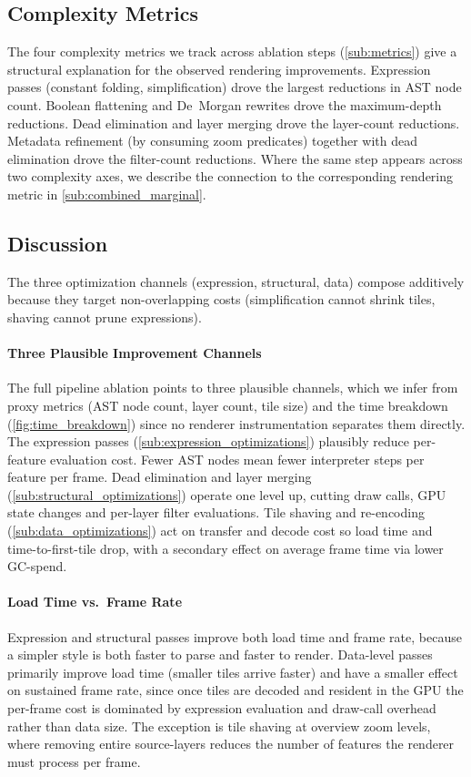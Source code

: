\subsection{Complexity Metrics}\label{sub:combined_complexity}

The four complexity metrics we track across ablation steps (\cref{sub:metrics}) give a structural explanation for the observed rendering improvements.
Expression passes (constant folding, simplification) drove the largest reductions in \ac{AST} node count.
Boolean flattening and De~Morgan rewrites drove the maximum-depth reductions.
Dead elimination and layer merging drove the layer-count reductions.
Metadata refinement (by consuming zoom predicates) together with dead elimination drove the filter-count reductions.
Where the same step appears across two complexity axes, we describe the connection to the corresponding rendering metric in \cref{sub:combined_marginal}.

\subsection{Discussion}\label{sub:combined_discussion}

The three optimization channels (expression, structural, data) compose additively because they target non-overlapping costs (simplification cannot shrink tiles, shaving cannot prune expressions).

\paragraph{Three Plausible Improvement Channels}
The full pipeline ablation points to three plausible channels, which we infer from proxy metrics (\ac{AST} node count, layer count, tile size) and the time breakdown (\cref{fig:time_breakdown}) since no renderer instrumentation separates them directly.
The expression passes (\cref{sub:expression_optimizations}) plausibly reduce per-feature evaluation cost.
Fewer \ac{AST} nodes mean fewer interpreter steps per feature per frame.
Dead elimination and layer merging (\cref{sub:structural_optimizations}) operate one level up, cutting draw calls, \ac{GPU} state changes and per-layer filter evaluations.
Tile shaving and re-encoding (\cref{sub:data_optimizations}) act on transfer and decode cost so load time and time-to-first-tile drop, with a secondary effect on average frame time via lower \ac{GC}-spend.

\paragraph{Load Time vs.\ Frame Rate}
Expression and structural passes improve both load time and frame rate, because a simpler style is both faster to parse and faster to render.
Data-level passes primarily improve load time (smaller tiles arrive faster) and have a smaller effect on sustained frame rate, since once tiles are decoded and resident in the \ac{GPU} the per-frame cost is dominated by expression evaluation and draw-call overhead rather than data size.
The exception is tile shaving at overview zoom levels, where removing entire source-layers reduces the number of features the renderer must process per frame.

